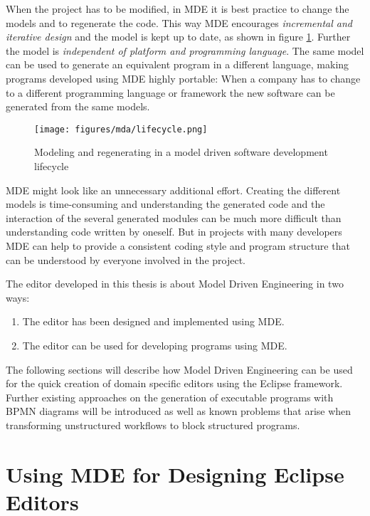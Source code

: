 When the project has to be modified, in MDE it is best practice to change the models and to regenerate the code. This way MDE encourages \emph{incremental and iterative design} and the model is kept up to date, as shown in figure \ref{fig:lifecycle}. Further the model is \emph{independent of platform and programming language}. The same model can be used to generate an equivalent program in a different language, making programs developed using MDE highly portable: When a company has to change to a different programming language or framework the new software can be generated from the same models.

\begin{figure}[htp]
	\centering
	\texttt{[image: figures/mda/lifecycle.png]}
	\caption[Model driven software development lifecycle]{Modeling and regenerating in a model driven software development lifecycle}
	\label{fig:lifecycle}
\end{figure}

MDE might look like an unnecessary additional effort. Creating the different models is time-consuming and understanding the generated code and the interaction of the several generated modules can be much more difficult than understanding code written by oneself. But in projects with many developers MDE can help to provide a consistent coding style and program structure that can be understood by everyone involved in the project.

The editor developed in this thesis is about Model Driven Engineering in two ways:

\begin{enumerate}
	\item The editor has been designed and implemented using MDE.
	\item The editor can be used for developing programs using MDE.
\end{enumerate}

The following sections will describe how Model Driven Engineering can be used for the quick creation of domain specific editors using the Eclipse framework. Further existing approaches on the generation of executable programs with BPMN diagrams will be introduced as well as known problems that arise when transforming unstructured workflows to block structured programs.



\section{Using MDE for Designing Eclipse Editors}
\label{sec:mda_eclipse}


